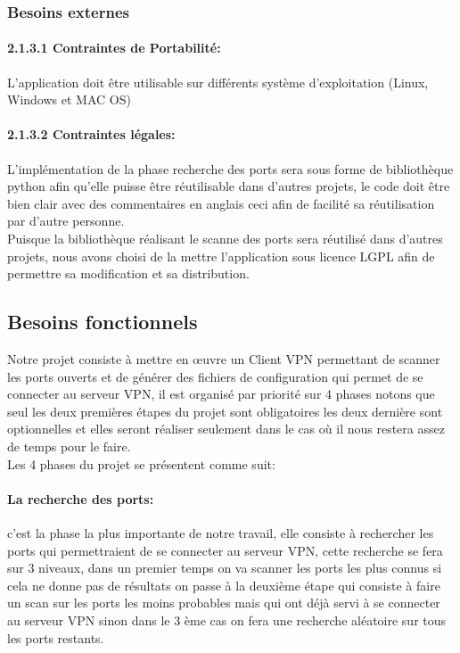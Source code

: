 \documentclass[12pt,a4paper]{article}
\begin{document}
\subsubsection{Besoins externes}

\paragraph{2.1.3.1 Contraintes de Portabilité: }
L’application doit être utilisable sur différents système d’exploitation (Linux, Windows et MAC OS)

\paragraph{2.1.3.2 Contraintes légales:}
L’implémentation de la phase recherche des ports sera sous forme de bibliothèque python afin qu'elle puisse être réutilisable dans d'autres projets, le code doit être bien clair avec des commentaires en anglais ceci afin de facilité sa réutilisation par d’autre personne.\\

Puisque la bibliothèque réalisant le scanne des ports sera réutilisé dans d’autres projets, nous avons choisi de la mettre l’application sous licence LGPL afin de permettre sa modification et sa distribution.\\

\subsection{Besoins fonctionnels}

\begin{flushleft}
Notre projet consiste à mettre en œuvre un Client VPN permettant de scanner les ports ouverts et de générer des fichiers de configuration qui permet de se connecter au serveur VPN, il est organisé par priorité sur 4 phases notons que seul les deux premières étapes du projet sont obligatoires les deux dernière sont optionnelles et elles seront réaliser seulement dans le cas où il nous restera assez de temps pour le faire.\\
Les 4 phases du projet se présentent comme suit:
\end{flushleft}
\paragraph{ La recherche des ports: }c'est la phase la plus importante de notre travail, elle consiste à rechercher les ports qui permettraient de se connecter au serveur VPN, cette recherche se fera sur 3 niveaux, dans un premier temps on va scanner les ports les plus connus si cela ne donne pas de résultats on passe à la deuxième étape qui consiste à faire un scan sur les ports les moins probables mais qui ont déjà servi à se connecter au serveur VPN sinon dans le 3 ème cas on fera une recherche aléatoire sur tous les ports restants.\\
\end{document}

